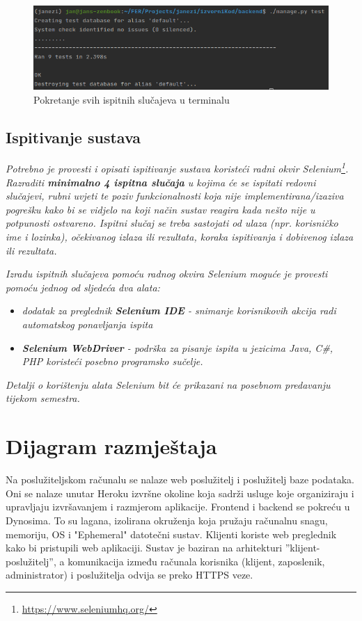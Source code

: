 			\begin{figure}[H]
				\centering
				\includegraphics[scale=0.65]{slike/TestsTerminal.PNG}
				\caption{Pokretanje svih ispitnih slučajeva u terminalu}
				\label{fig:TestsTerminal}
			\end{figure}
			
			
			\subsection{Ispitivanje sustava}
			
			 \textit{Potrebno je provesti i opisati ispitivanje sustava koristeći radni okvir Selenium\footnote{\url{https://www.seleniumhq.org/}}. Razraditi \textbf{minimalno 4 ispitna slučaja} u kojima će se ispitati redovni slučajevi, rubni uvjeti te poziv funkcionalnosti koja nije implementirana/izaziva pogrešku kako bi se vidjelo na koji način sustav reagira kada nešto nije u potpunosti ostvareno. Ispitni slučaj se treba sastojati od ulaza (npr. korisničko ime i lozinka), očekivanog izlaza ili rezultata, koraka ispitivanja i dobivenog izlaza ili rezultata.\\ }
			 
			 \textit{Izradu ispitnih slučajeva pomoću radnog okvira Selenium moguće je provesti pomoću jednog od sljedeća dva alata:}
			 \begin{itemize}
			 	\item \textit{dodatak za preglednik \textbf{Selenium IDE} - snimanje korisnikovih akcija radi automatskog ponavljanja ispita	}
			 	\item \textit{\textbf{Selenium WebDriver} - podrška za pisanje ispita u jezicima Java, C\#, PHP koristeći posebno programsko sučelje.}
			 \end{itemize}
		 	\textit{Detalji o korištenju alata Selenium bit će prikazani na posebnom predavanju tijekom semestra.}
			
			\eject 
		
		
		\section{Dijagram razmještaja}
			Na poslužiteljskom računalu se nalaze web poslužitelj i poslužitelj baze podataka. Oni se nalaze unutar Heroku izvršne okoline koja sadrži usluge koje organiziraju i upravljaju izvršavanjem i razmjerom aplikacije. Frontend i backend se pokreću u Dynosima. To su lagana, izolirana okruženja koja pružaju računalnu snagu, memoriju, OS i "Ephemeral" datotečni sustav. Klijenti koriste web preglednik kako bi pristupili web aplikaciji.  Sustav je baziran na arhitekturi ”klijent-poslužitelj”, a komunikacija između računala korisnika (klijent, zaposlenik, administrator) i poslužitelja odvija se preko HTTPS veze.
			
